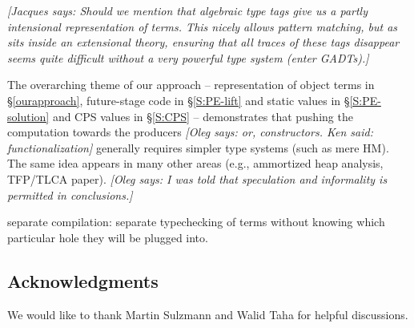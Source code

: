 \documentclass[preprint]{sigplanconf}
\newcommand{\jacques}[1]{{\it [Jacques says: #1]}}
\newcommand{\oleg}[1]{{\it [Oleg says: #1]}}
\begin{document}

\jacques{Should we mention that algebraic type tags give us a partly
intensional representation of terms.  This nicely allows pattern matching,
but as sits inside an extensional theory, ensuring that all traces 
of these tags disappear seems quite difficult without a very powerful
type system (enter GADTs).}


The overarching theme of our approach -- representation of object terms in 
\S\ref{ourapproach}, future-stage code in \S\ref{S:PE-lift} and static
values in \S\ref{S:PE-solution} and CPS values in \S\ref{S:CPS} --
demonstrates that pushing the computation towards the producers
\oleg{or, constructors. Ken said: functionalization} generally
requires simpler type systems (such as mere HM). The same idea appears
in many other areas (e.g., ammortized heap analysis, TFP/TLCA paper).
\oleg{I was told that speculation and informality is permitted in
  conclusions.}

separate compilation: separate
typechecking of terms without knowing which particular
hole they will be plugged into. 



\subsection*{Acknowledgments}
We would like to thank Martin Sulzmann and Walid Taha 
for helpful discussions.


\bibsep=0pt

\end{document}
